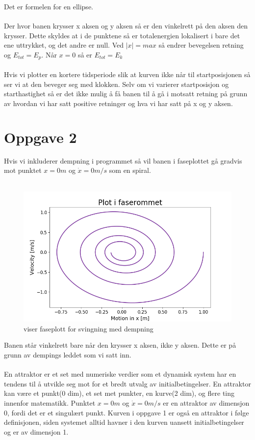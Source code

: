 \documentclass[norsk,a4paper,12pt]{article}
\begin{document}
Det er formelen for en ellipse.
\\
\\
Der hvor banen krysser x aksen og y aksen så er den vinkelrett på den aksen den krysser. Dette skyldes at i de punktene så er totalenergien lokalisert i bare det ene uttrykket, og det andre er null. Ved $|x| = max$ så endrer bevegelsen retning og $E_{tot} = E_p$. Når $x=0$ så er $E_{tot}=E_k$
\\
\\
Hvis vi plotter en kortere tidsperiode slik at kurven ikke når til startposisjonen så ser vi at den beveger seg med klokken. Selv om vi varierer startposisjon og starthastighet så er det ikke mulig å få banen til å gå i motsatt retning på grunn av hvordan vi har satt positive retninger og hva vi har satt på x og y aksen.
\\




\section*{Oppgave 2}
Hvis vi inkluderer dempning i programmet så vil banen i faseplottet gå gradvis mot punktet $x = 0m$ og $\dot{x} = 0 m/s$ som en spiral.
\\
\\
\begin{figure}[H]
\begin{center}
\includegraphics[scale=0.5]{Oppgave2fase.png}
\caption{viser faseplott for svingning med dempning}
\label{fig:faseplot2}
\end{center}
\end{figure}

Banen står vinkelrett bare når den krysser x aksen, ikke y aksen. Dette er på grunn av dempings leddet som vi satt inn. 
\\
\\
En attraktor er et set med numeriske verdier som et dynamisk system har en tendens til å utvikle seg mot for et bredt utvalg av initialbetingelser. En attraktor kan være et punkt(0 dim), et set met punkter, en kurve(2 dim), og flere ting innenfor matematikk. Punktet $x=0m$ og $\dot{x}=0m/s$ er en attraktor av dimensjon 0, fordi det er et singulært punkt. Kurven i oppgave 1 er også en attraktor i følge definisjonen, siden systemet alltid havner i den kurven uansett initialbetingelser og er av dimensjon 1. 
\end{document}
